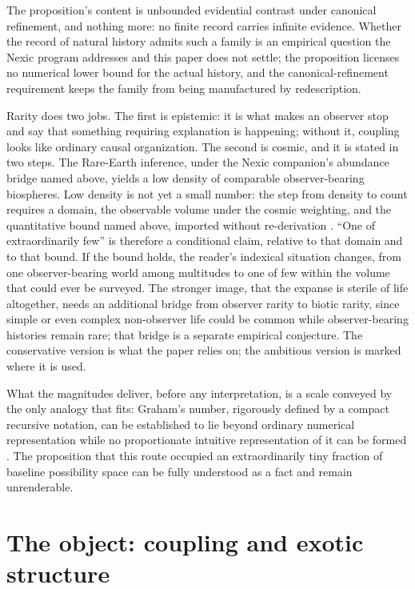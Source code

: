 \noindent The proposition's content is unbounded evidential contrast under
canonical refinement, and nothing more: no finite record carries infinite
evidence. Whether the record of natural history admits such a family is an
empirical question the Nexic program addresses and this paper does not
settle; the proposition licenses no numerical lower bound for the actual
history, and the canonical-refinement requirement keeps the family from being
manufactured by redescription.

Rarity does two jobs. The first is epistemic: it is what makes an observer
stop and say that something requiring explanation is happening; without it,
coupling looks like ordinary causal organization. The second is cosmic, and
it is stated in two steps. The Rare-Earth inference, under the Nexic
companion's abundance bridge named above, yields a low density of comparable
observer-bearing biospheres. Low density is not yet a small number: the step
from density to count requires a domain, the observable volume under the
cosmic weighting, and the quantitative bound named above, imported without
re-derivation \cite{Nexus}. ``One of extraordinarily few'' is therefore a
conditional claim, relative to that domain and to that bound. If the bound
holds, the reader's indexical situation changes, from one observer-bearing
world among multitudes to one of few within the volume that could ever be
surveyed. The stronger image, that the expanse is
sterile of life altogether, needs an additional bridge from observer rarity
to biotic rarity, since simple or even complex non-observer life could be
common while observer-bearing histories remain rare; that bridge is a
separate empirical conjecture. The conservative version is what the paper
relies on; the ambitious version is marked where it is used.

What the magnitudes deliver, before any interpretation, is a scale conveyed
by the only analogy that fits: Graham's number, rigorously defined by a
compact recursive notation, can be established to lie beyond ordinary
numerical representation while no proportionate intuitive representation of
it can be formed \cite{gardner1977mathematical}. The proposition that this
route occupied an extraordinarily tiny fraction of baseline possibility space
can be fully understood as a fact and remain unrenderable.

\section{The object: coupling and exotic structure}\label{sec:exotic}

